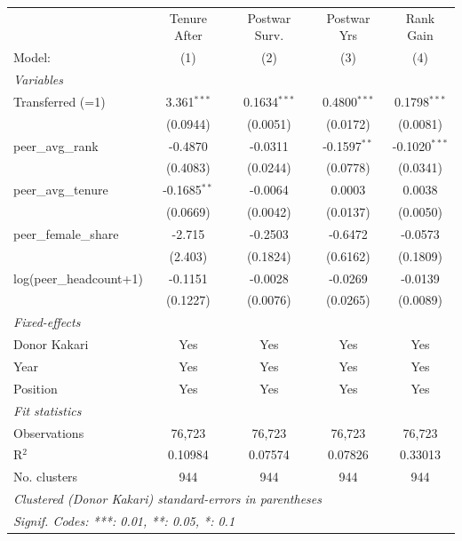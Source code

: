 \begin{table}[p]
\begin{threeparttable}
\begin{tabular}{lcccc}
   \tabularnewline \midrule \midrule
                                  & Tenure After   & Postwar Surv.      & Postwar Yrs     & Rank Gain \\   
   Model:                         & (1)            & (2)                & (3)             & (4)\\  
   \midrule
   \emph{Variables}\\
   Transferred (=1)               & 3.361$^{***}$  & 0.1634$^{***}$     & 0.4800$^{***}$  & 0.1798$^{***}$\\   
                                  & (0.0944)       & (0.0051)           & (0.0172)        & (0.0081)\\   
   peer\_avg\_rank                & -0.4870        & -0.0311            & -0.1597$^{**}$  & -0.1020$^{***}$\\   
                                  & (0.4083)       & (0.0244)           & (0.0778)        & (0.0341)\\   
   peer\_avg\_tenure              & -0.1685$^{**}$ & -0.0064            & 0.0003          & 0.0038\\   
                                  & (0.0669)       & (0.0042)           & (0.0137)        & (0.0050)\\   
   peer\_female\_share            & -2.715         & -0.2503            & -0.6472         & -0.0573\\   
                                  & (2.403)        & (0.1824)           & (0.6162)        & (0.1809)\\   
   log(peer\_headcount+1)         & -0.1151        & -0.0028            & -0.0269         & -0.0139\\   
                                  & (0.1227)       & (0.0076)           & (0.0265)        & (0.0089)\\   
   \midrule
   \emph{Fixed-effects}\\
   Donor Kakari                   & Yes            & Yes                & Yes             & Yes\\  
   Year                           & Yes            & Yes                & Yes             & Yes\\  
   Position                       & Yes            & Yes                & Yes             & Yes\\  
   \midrule
   \emph{Fit statistics}\\
   Observations                   & 76,723         & 76,723             & 76,723          & 76,723\\  
   R$^2$                          & 0.10984        & 0.07574            & 0.07826         & 0.33013\\  
   No. clusters & 944            & 944                & 944             & 944\\  
   \midrule \midrule
   \multicolumn{5}{l}{\emph{Clustered (Donor Kakari) standard-errors in parentheses}}\\
   \multicolumn{5}{l}{\emph{Signif. Codes: ***: 0.01, **: 0.05, *: 0.1}}\\
\end{tabular}


\end{threeparttable}
\end{table}
